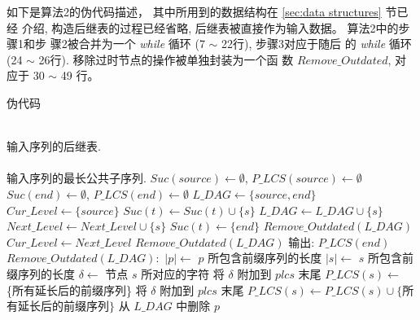 \documentclass[utf8]{frontiersSCNS} %
\newenvironment{varalgorithm}[1]
  {\algorithm\renewcommand{\thealgorithm}{#1}}
  {\endalgorithm}
\begin{document}
如下是算法2的伪代码描述， 其中所用到的数据结构在 \ref{sec:data structures} 节已经
介绍, 构造后继表的过程已经省略, 后继表被直接作为输入数据。 算法2中的步骤1和步
骤2被合并为一个 \emph{while} 循环 (7 $\sim$ 22行), 步骤3对应于随后
的 \emph{while} 循环 (24 $\sim$ 26行). 移除过时节点的操作被单独封装为一个函
数 $Remove\_Outdated$, 对应于 30 $\sim$ 49 行。

\begin{varalgorithm}{2:}
  \caption{伪代码}
  \footnotesize
  \label{alg:PMA}
  \begin{algorithmic}[1]
    \REQUIRE ~~\\
    输入序列的后继表.\\
    \ENSURE ~~\\
    输入序列的最长公共子序列.
    \STATE
    \STATE $Suc(source) \leftarrow \emptyset$, $P\_LCS(source) \leftarrow \emptyset$
    \STATE $Suc(end) \leftarrow \emptyset$, $P\_LCS(end) \leftarrow \emptyset$
    \STATE $L\_DAG \leftarrow \{source, end\}$
    \STATE $Cur\_Level \leftarrow \{source\}$
    \STATE
    \STATE $Suc(t) \leftarrow Suc(t) \cup \{s\}$
    \STATE $L\_DAG \leftarrow L\_DAG \cup \{s\}$
    \STATE $Next\_Level \leftarrow Next\_Level \cup \{s\}$
    \ENDIF
    \ENDFOR
    \STATE $Suc(t) \leftarrow \{end\}$
    \ENDIF
    \ENDFOR
    \STATE $Remove\_Outdated(L\_DAG)$
    \STATE $Cur\_Level \leftarrow Next\_Level$
    \ENDWHILE
    \STATE
    \STATE $Remove\_Outdated(L\_DAG)$
    \ENDWHILE
    \STATE
    \STATE 输出: $P\_LCS(end)$
    \STATE
    \STATE $Remove\_Outdated(L\_DAG):$
    \STATE $|p| \leftarrow $ $p$ 所包含前缀序列的长度
    \STATE $|s| \leftarrow $ $s$ 所包含前缀序列的长度
    \STATE $\delta \leftarrow $ 节点 $s$ 所对应的字符
    \STATE 将 $\delta$ 附加到 $plcs$ 末尾
    \ENDFOR
    \STATE $P\_LCS(s) \leftarrow $ \{所有延长后的前缀序列\} 
    \STATE 将 $\delta$ 附加到 $plcs$ 末尾
    \ENDFOR
    \STATE $P\_LCS(s) \leftarrow P\_LCS(s) \cup \{$所有延长后的前缀序列$\}$
    \ENDIF
    \STATE 从 $L\_DAG$ 中删除 $p$
    \ENDFOR
    \ENDFOR
  \end{algorithmic}
\end{varalgorithm}
\end{document}
